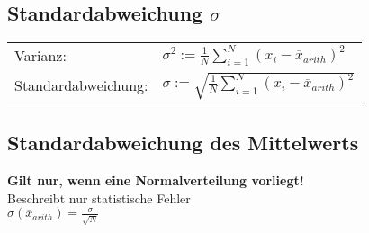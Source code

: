 		
		
	\subsection{Standardabweichung $\sigma$}	
		
	\begin{tabular}{ll}
	Varianz: & $\sigma^2 := \frac{1}{N} \sum \limits_{i = 1}^N (x_i - \overline{x}_{arith} )^2 $ \\

	Standardabweichung: &  $\sigma := \sqrt{ \frac{1}{N} \sum \limits_{i = 1}^N (x_i - \overline{x}_{arith} )^2 }$ \\
	\end{tabular}
		
		
		
	\subsection{Standardabweichung des Mittelwerts}	
	\textbf{Gilt nur, wenn eine Normalverteilung vorliegt!} \\
	Beschreibt nur statistische Fehler \\

	$\sigma(\overline{x}_{arith}) = \frac{\sigma}{\sqrt{N}} $
		
		